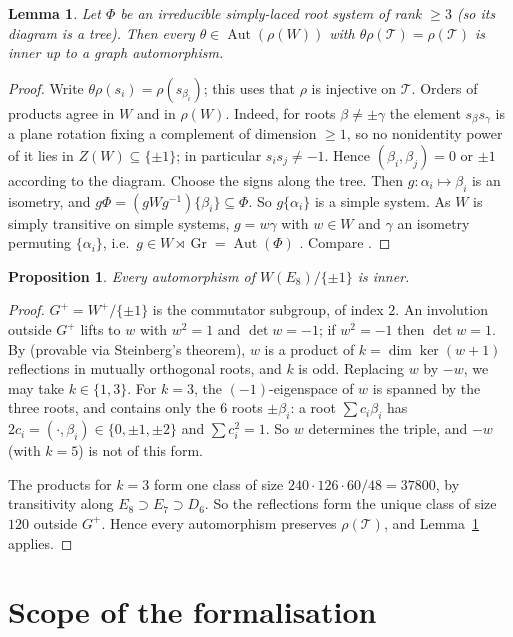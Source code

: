 \documentclass[11pt]{amsart}
\newtheorem{lemma}[theorem]{Lemma}
\newtheorem{proposition}[theorem]{Proposition}
\theoremstyle{definition}
\newcommand{\T}{\mathcal{T}}
\newcommand{\Aut}{\operatorname{Aut}}
\newcommand{\Gr}{\operatorname{Gr}}
\begin{document}
\begin{lemma}\label{lem:sign}
Let $\Phi$ be an irreducible simply-laced root system of rank $\ge3$ (so its diagram is a tree). Then every
$\theta\in\Aut(\rho(W))$ with $\theta\rho(\T)=\rho(\T)$ is inner up to a graph automorphism.
\end{lemma}
\begin{proof}
Write $\theta\rho(s_i)=\rho(s_{\beta_i})$; this uses that $\rho$ is injective on $\T$. Orders of products agree in $W$
and in $\rho(W)$. Indeed, for roots $\beta\ne\pm\gamma$ the element $s_\beta s_\gamma$ is a plane rotation fixing a
complement of dimension $\ge1$, so no nonidentity power of it lies in $Z(W)\subseteq\{\pm1\}$; in particular
$s_is_j\ne-1$. Hence $(\beta_i,\beta_j)=0$ or $\pm1$ according to the diagram. Choose the signs along the tree. Then $g\colon\alpha_i\mapsto\beta_i$ is an isometry, and
$g\Phi=(gWg^{-1})\{\beta_i\}\subseteq\Phi$. So $g\{\alpha_i\}$ is a simple system. As $W$ is simply transitive on simple systems, $g=w\gamma$ with $w\in W$ and
$\gamma$ an isometry permuting $\{\alpha_i\}$, i.e.\ $g\in W\rtimes\Gr=\Aut(\Phi)$ \cite[\S1.8, p.~15]{Hum90}. Compare
\cite[Thm.~18, Cor.~19]{FH03}.
\end{proof}

\begin{proposition}\label{prop:E8}
Every automorphism of $W(E_8)/\{\pm1\}$ is inner.
\end{proposition}
\begin{proof}
$G^+=W^+/\{\pm1\}$ is the commutator subgroup, of index $2$. An involution outside $G^+$ lifts to $w$ with $w^2=1$
and $\det w=-1$; if $w^2=-1$ then $\det w=1$. By \cite[Lemma~5, p.~5]{Car72} (provable via Steinberg's theorem), $w$ is a product of $k=\dim\ker(w+1)$ reflections in
mutually orthogonal roots, and $k$ is odd. Replacing $w$ by $-w$, we may take $k\in\{1,3\}$. For $k=3$, the
$(-1)$-eigenspace of $w$ is spanned by the three roots, and contains only the $6$ roots $\pm\beta_i$: a root
$\sum c_i\beta_i$ has $2c_i=(\cdot,\beta_i)\in\{0,\pm1,\pm2\}$ and $\sum c_i^2=1$. So $w$ determines the triple,
and $-w$ (with $k=5$) is not of this form.

The products for $k=3$ form one class of size $240\cdot126\cdot60/48=37800$, by transitivity along
$E_8\supset E_7\supset D_6$. So the reflections form the unique class of size $120$ outside $G^+$. Hence every
automorphism preserves $\rho(\T)$, and Lemma~\ref{lem:sign} applies.
\end{proof}

\section{Scope of the formalisation}\label{app:artin}
\end{document}
